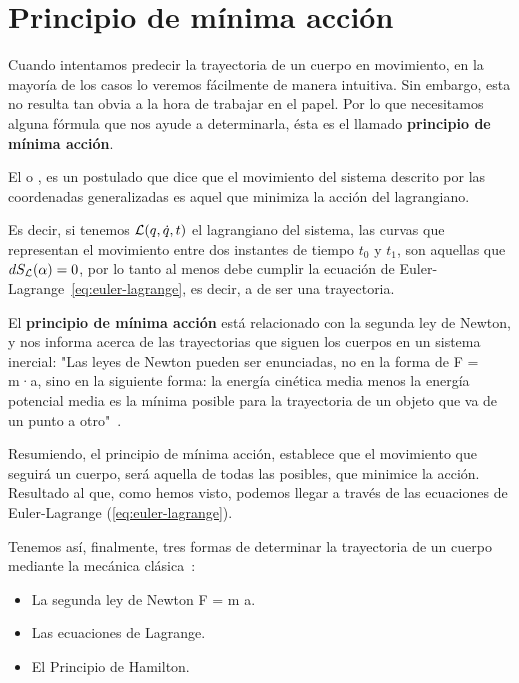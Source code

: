 \section{Principio de mínima acción}\label{sec:principio-de-minima-accion}

Cuando intentamos predecir la trayectoria de un cuerpo en movimiento, en la mayoría de los casos lo veremos fácilmente de manera intuitiva. Sin embargo, esta no resulta tan obvia a la hora de trabajar en el papel. Por lo que necesitamos alguna fórmula que nos ayude a determinarla, ésta es el llamado \textbf{principio de mínima acción}.

El  o , es un postulado que dice que el movimiento del sistema descrito por las coordenadas generalizadas es aquel que minimiza la acción del lagrangiano\label{po:pma}.

Es decir, si tenemos $\mathcal{L}(q,\dot{q}, t)$ el lagrangiano del sistema, las curvas que representan el movimiento entre dos instantes de tiempo $t_0$ y $t_1$, son aquellas que $dS_{\mathcal{L}}(\alpha)=0$, por lo tanto al menos debe cumplir la ecuación de Euler-Lagrange~\eqref{eq:euler-lagrange}, es decir, a de ser una trayectoria.

El \textbf{principio de mínima acción} está relacionado con la segunda ley de Newton, y nos informa acerca de las trayectorias que siguen los cuerpos en un sistema inercial:
"Las leyes de Newton pueden ser enunciadas, no en la forma de F = m·a, sino en la siguiente forma: la energía cinética media menos la energía potencial media es la mínima posible para la trayectoria de un objeto que va de un punto a otro"~\cite{Feynman}.

Resumiendo, el principio de mínima acción, establece que el movimiento que seguirá un cuerpo, será aquella de todas las posibles, que minimice la acción. Resultado al que, como hemos visto, podemos llegar a través de las ecuaciones de Euler-Lagrange (\eqref{eq:euler-lagrange}).

Tenemos así, finalmente, tres formas de determinar la trayectoria de un cuerpo mediante la mecánica clásica~\autocite[264]{Taylor}:
\begin{itemize}
    \item La segunda ley de Newton F = m \cdot a.
    \item Las ecuaciones de Lagrange.
    \item El Principio de Hamilton.
\end{itemize}